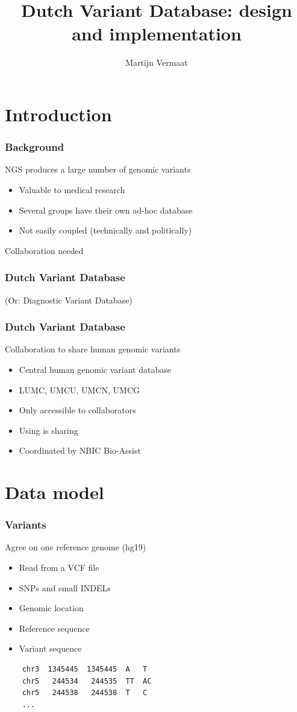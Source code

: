 \documentclass[slidestop]{beamer}
\title{Dutch Variant Database: design and implementation}
\author{Martijn Vermaat}
\begin{document}

\bodytemplate


\section{Introduction}

\begin{frame}
  \frametitle{Background}
  NGS produces a large number of genomic variants
  \begin{itemize}
    \item Valuable to medical research
    \item Several groups have their own ad-hoc database
    \item Not easily coupled (technically and politically)
  \end{itemize}
  \vspace{1cm}
  Collaboration needed
\end{frame}

\begin{frame}
 \frametitle{Dutch Variant Database}
 (Or: Diagnostic Variant Database)
\end{frame}

\begin{frame}
  \frametitle{Dutch Variant Database}
  Collaboration to share human genomic variants
  \begin{itemize}
    \item Central human genomic variant database
    \item LUMC, UMCU, UMCN, UMCG
    \item Only accessible to collaborators
    \item Using is sharing
    \item Coordinated by NBIC Bio-Assist
  \end{itemize}
\end{frame}

\section{Data model}

\begin{frame}[fragile]
  \frametitle{Variants}
  Agree on one reference genome (hg19)
  \begin{itemize}
    \item Read from a VCF file
    \item SNPs and small INDELs
    \item Genomic location
    \item Reference sequence
    \item Variant sequence
  \end{itemize}
  \vspace{1cm}
  \pause
  \begin{verbatim}
    chr3  1345445  1345445  A   T
    chr5   244534   244535  TT  AC
    chr5   244538   244538  T   C
    ...
  \end{verbatim}
\end{frame}
\end{document}
